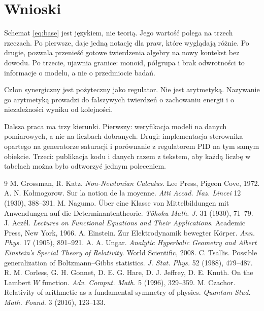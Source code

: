 \documentclass[11pt,a4paper]{article}
\begin{document}
\section{Wnioski}

Schemat \eqref{eq:base} jest językiem, nie teorią. Jego wartość polega na
trzech rzeczach. Po pierwsze, daje jedną notację dla praw, które wyglądają
różnie. Po drugie, pozwala przenieść gotowe twierdzenia algebry na nowy
kontekst bez dowodu. Po trzecie, ujawnia granice: monoid, półgrupa i brak
odwrotności to informacje o modelu, a nie o przedmiocie badań.

Człon synergiczny jest pożyteczny jako regulator. Nie jest arytmetyką.
Nazywanie go arytmetyką prowadzi do fałszywych twierdzeń o zachowaniu energii
i o niezależności wyniku od kolejności.

Dalsza praca ma trzy kierunki. Pierwszy: weryfikacja modeli na danych
pomiarowych, a nie na liczbach dobranych. Drugi: implementacja sterownika
opartego na generatorze saturacji i porównanie z regulatorem PID na tym samym
obiekcie. Trzeci: publikacja kodu i danych razem z tekstem, aby każdą liczbę
w tabelach można było odtworzyć jednym poleceniem.

{\footnotesize
\setlength{\itemsep}{1pt}
\begin{thebibliography}{9}
 M. Grossman, R. Katz.
\emph{Non-Newtonian Calculus}. Lee Press, Pigeon Cove, 1972.
 A. N. Kołmogorow.
Sur la notion de la moyenne. \emph{Atti Accad. Naz. Lincei} 12 (1930), 388--391.
 M. Nagumo.
Über eine Klasse von Mittelbildungen mit Anwendungen auf die
Determinantentheorie. \emph{Tôhoku Math. J.} 31 (1930), 71--79.
 J. Aczél.
\emph{Lectures on Functional Equations and Their Applications}.
Academic Press, New York, 1966.
 A. Einstein.
Zur Elektrodynamik bewegter Körper. \emph{Ann. Phys.} 17 (1905), 891--921.
 A. A. Ungar.
\emph{Analytic Hyperbolic Geometry and Albert Einstein's Special Theory of
Relativity}. World Scientific, 2008.
 C. Tsallis.
Possible generalization of Boltzmann--Gibbs statistics.
\emph{J. Stat. Phys.} 52 (1988), 479--487.
 R. M. Corless, G. H. Gonnet, D. E. G. Hare, D. J. Jeffrey,
D. E. Knuth. On the Lambert $W$ function.
\emph{Adv. Comput. Math.} 5 (1996), 329--359.
 M. Czachor.
Relativity of arithmetic as a fundamental symmetry of physics.
\emph{Quantum Stud. Math. Found.} 3 (2016), 123--133.
\end{thebibliography}
}
\end{document}
